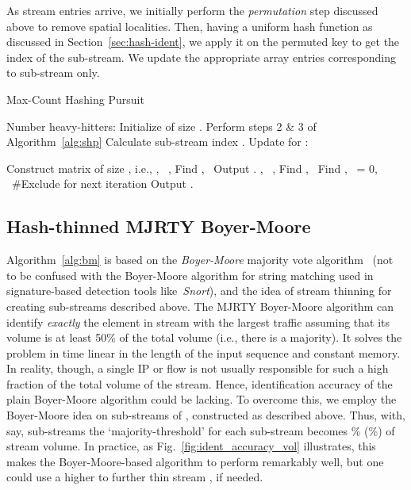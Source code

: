 \documentclass[10pt, conference, letterpaper,onecolumn]{IEEEtranv1.8}
\theoremstyle{plain}\newtheorem{thm}{Theorem}\newtheorem{lem}{Lemma}
\theoremstyle{definition}
\begin{document}
As stream entries arrive, we initially perform the \emph{permutation}
step discussed above to remove spatial localities.
Then, having a uniform hash function
 as discussed in Section~\ref{sec:hash-ident},
we apply it on the permuted key  to get the index  of the sub-stream.
We update the appropriate array entries corresponding to sub-stream  only.




\setcounter{algorithm}{1}
\begin{algorithm}[t]
\caption{Max-Count Hashing Pursuit}
\label{alg:max-count}
\begin{algorithmic}[1]
\REQUIRE Number heavy-hitters: 
\STATE [Start]  Initialize   of size .
\STATE Perform steps 2 \& 3 of Algorithm~\ref{alg:shp}
\STATE [Thin] Calculate sub-stream index .
\STATE [Update]    Update   for :
   
 \vspace{-10pt}  
	\STATE  Construct matrix  of size , i.e.,
	 \STATE , \ ,  
	 \STATE Find , \  
	 \STATE [decode]      Output . 
 \ELSE
	 \STATE , \ ,  
	 \STATE Find , \  
	 \STATE Find , \   
	 \STATE  = 0, \   {\#Exclude for next iteration }
	 \STATE [decode]      Output . 
  \ENDFOR
 \ENDIF 
 \ENDIF   
\end{algorithmic}
\end{algorithm} 
 
 
 
 


 \subsection{Hash-thinned MJRTY Boyer-Moore}
 \label{sec:bm}
 
 Algorithm~\ref{alg:bm} is based on the \emph{Boyer-Moore} majority vote algorithm~\cite{boyer_moore1991} (not
 to be confused with the Boyer-Moore algorithm for string matching  used in
 signature-based detection tools like~\emph{Snort}),
 and the idea of stream thinning for creating sub-streams described above. The
 MJRTY Boyer-Moore algorithm can identify \emph{exactly} the element
 in stream  with the largest traffic assuming that its volume is at least 50\% of the total volume (i.e., there is a majority).
 It solves the problem in time linear in the length of the input sequence and constant memory.
 In reality, though, a single IP or flow is not usually responsible for such a high fraction of the total volume of the stream. Hence,
 identification accuracy of the plain Boyer-Moore algorithm could be lacking. To overcome this, we employ the Boyer-Moore
 idea on sub-streams of , constructed as described above. Thus, with, say,  sub-streams 
 the `majority-threshold' for each sub-stream becomes \% (\%) of  stream  volume. In practice, as Fig.~\ref{fig:ident_accuracy_vol} illustrates, this makes  the Boyer-Moore-based algorithm to perform remarkably well, but one could use a higher  to further thin stream , if needed.  
 
\end{document}
